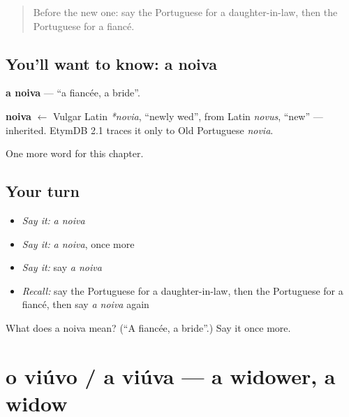 \label{lesson:PT-C221-noiva}



\begin{quote}
Before the new one: say the Portuguese for a daughter-in-law, then the Portuguese for a fiancé.
\end{quote}

\subsection*{You'll want to know: a noiva}
\textbf{a noiva} — \textquotedblleft{}a fiancée, a bride\textquotedblright{}.

\begin{cousinweb}
\textbf{noiva} $\leftarrow$ Vulgar Latin \emph{*novia}, \textquotedblleft{}newly wed\textquotedblright{}, from Latin \emph{novus}, \textquotedblleft{}new\textquotedblright{} — inherited. EtymDB 2.1 traces it only to Old Portuguese \emph{novia}.
\end{cousinweb}

\begin{grammarlens}[title={What you've built}]
One more word for this chapter.
\end{grammarlens}

\subsection*{Your turn}
\begin{itemize}
\raggedright
  \item \emph{Say it:} \emph{a noiva}
  \item \emph{Say it:} \emph{a noiva}, once more
  \item \emph{Say it:} say \emph{a noiva}
  \item \emph{Recall:} say the Portuguese for a daughter-in-law, then the Portuguese for a fiancé, then say \emph{a noiva} again
\end{itemize}

\begin{tcolorbox}[breakable,colback=teal!4,colframe=teal!35!black,title={Before you move on}]
What does a noiva mean? (\textquotedblleft{}A fiancée, a bride\textquotedblright{}.) Say it once more.
\end{tcolorbox}
\section[o viúvo / a viúva]{o viúvo / a viúva — a widower, a widow}

